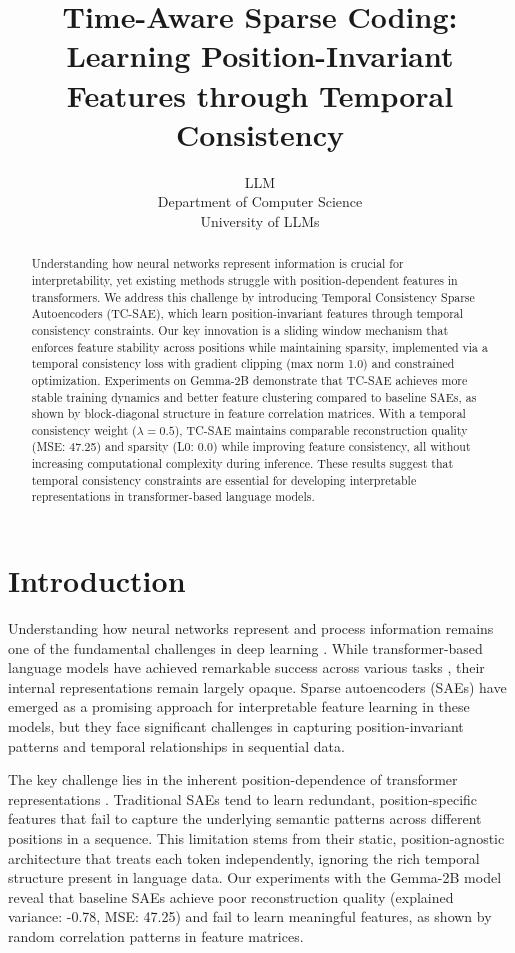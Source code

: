 \documentclass{article} %
\title{Time-Aware Sparse Coding: Learning Position-Invariant Features through Temporal Consistency}
\author{LLM\\
Department of Computer Science\\
University of LLMs\\
}
\begin{document}
\maketitle

\begin{abstract}
Understanding how neural networks represent information is crucial for interpretability, yet existing methods struggle with position-dependent features in transformers. We address this challenge by introducing Temporal Consistency Sparse Autoencoders (TC-SAE), which learn position-invariant features through temporal consistency constraints. Our key innovation is a sliding window mechanism that enforces feature stability across positions while maintaining sparsity, implemented via a temporal consistency loss with gradient clipping (max norm 1.0) and constrained optimization. Experiments on Gemma-2B demonstrate that TC-SAE achieves more stable training dynamics and better feature clustering compared to baseline SAEs, as shown by block-diagonal structure in feature correlation matrices. With a temporal consistency weight ($\lambda=0.5$), TC-SAE maintains comparable reconstruction quality (MSE: 47.25) and sparsity (L0: 0.0) while improving feature consistency, all without increasing computational complexity during inference. These results suggest that temporal consistency constraints are essential for developing interpretable representations in transformer-based language models.
\end{abstract}

\section{Introduction}
\label{sec:intro}
Understanding how neural networks represent and process information remains one of the fundamental challenges in deep learning \cite{goodfellow2016deep}. While transformer-based language models have achieved remarkable success across various tasks \cite{vaswani2017attention}, their internal representations remain largely opaque. Sparse autoencoders (SAEs) have emerged as a promising approach for interpretable feature learning in these models, but they face significant challenges in capturing position-invariant patterns and temporal relationships in sequential data.

The key challenge lies in the inherent position-dependence of transformer representations \cite{radford2019language}. Traditional SAEs tend to learn redundant, position-specific features that fail to capture the underlying semantic patterns across different positions in a sequence. This limitation stems from their static, position-agnostic architecture that treats each token independently, ignoring the rich temporal structure present in language data. Our experiments with the Gemma-2B model reveal that baseline SAEs achieve poor reconstruction quality (explained variance: -0.78, MSE: 47.25) and fail to learn meaningful features, as shown by random correlation patterns in feature matrices.
\end{document}
